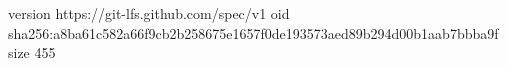 version https://git-lfs.github.com/spec/v1
oid sha256:a8ba61c582a66f9cb2b258675e1657f0de193573aed89b294d00b1aab7bbba9f
size 455

